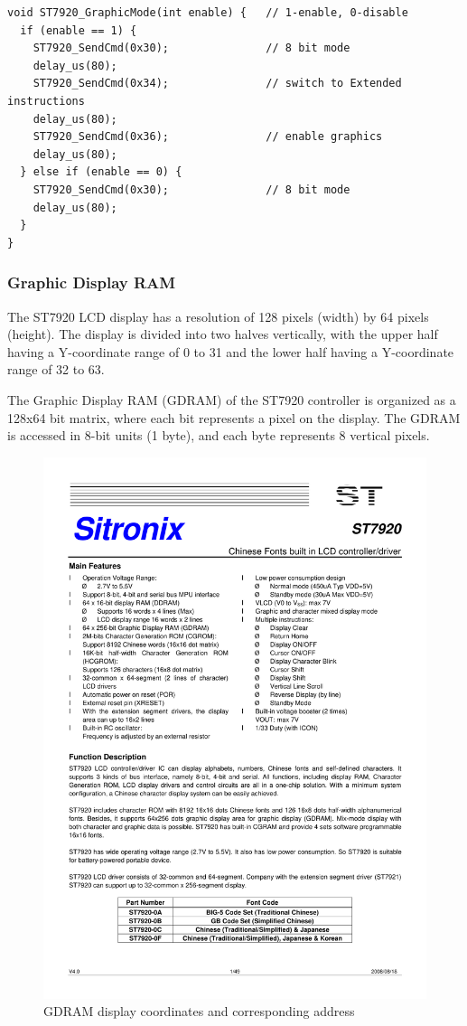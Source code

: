 \documentclass[a4paper, twoside]{report}
\begin{document}
\begin{verbatim}
void ST7920_GraphicMode(int enable) {   // 1-enable, 0-disable
  if (enable == 1) {
    ST7920_SendCmd(0x30);               // 8 bit mode
    delay_us(80);
    ST7920_SendCmd(0x34);               // switch to Extended instructions
    delay_us(80);
    ST7920_SendCmd(0x36);               // enable graphics
    delay_us(80);
  } else if (enable == 0) {
    ST7920_SendCmd(0x30);               // 8 bit mode
    delay_us(80);
  }
}
\end{verbatim}

\subsubsection{Graphic Display RAM}
The ST7920 LCD display has a resolution of 128 pixels (width) by 64 pixels (height). The display is divided into two halves vertically, with the upper half having a Y-coordinate range of 0 to 31 and the lower half having a Y-coordinate range of 32 to 63.

The Graphic Display RAM (GDRAM) of the ST7920 controller is organized as a 128x64 bit matrix, where each bit represents a pixel on the display. The GDRAM is accessed in 8-bit units (1 byte), and each byte represents 8 vertical pixels.

\begin{figure}[H]
    \centering
    \includegraphics[page=15,trim=2cm 10cm 2cm 3.8cm, clip]{Datasheet/ST7920.pdf}
    \caption{GDRAM display coordinates and corresponding address}
\end{figure}
\end{document}
